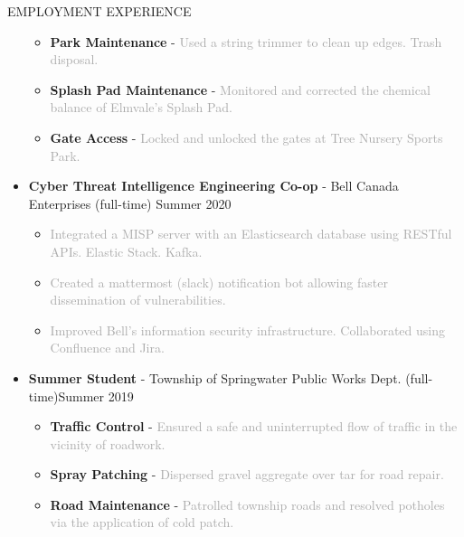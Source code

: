 \documentclass{resume} %
\begin{document}
\begin{rSection}{EMPLOYMENT EXPERIENCE}
\begin{itemize}
\begin{itemize}[topsep=-10pt]
            \item[\textbullet] {\bf Park Maintenance} - \textcolor{darkgray}{Used a string trimmer to clean up edges. Trash disposal.}
            \item[\textbullet] {\bf Splash Pad Maintenance} - \textcolor{darkgray}{Monitored and corrected the chemical balance of Elmvale's Splash Pad.}
            \item[\textbullet] {\bf Gate Access} - \textcolor{darkgray}{Locked and unlocked the gates at Tree Nursery Sports Park.}
        \end{itemize}
        \item {\bf Cyber Threat Intelligence Engineering Co-op} - Bell Canada Enterprises (full-time) \hfill {Summer 2020}
        \begin{itemize}[topsep=-10pt]
            \setlength\itemsep{-0.5em}
            \item[\textbullet] \textcolor{darkgray}{Integrated a MISP server with an Elasticsearch database using RESTful APIs. Elastic Stack. Kafka.}
            \item[\textbullet] \textcolor{darkgray}{Created a mattermost (slack) notification bot allowing faster dissemination of vulnerabilities.}
            \item[\textbullet] \textcolor{darkgray}{Improved Bell's information security infrastructure. Collaborated using Confluence and Jira.}
        \end{itemize}
        \item {\bf Summer Student} - Township of Springwater Public Works Dept. (full-time)\hfill {Summer 2019}
        \begin{itemize}[topsep=-10pt]
            \setlength\itemsep{-0.5em}
            \item[\textbullet] {\bf Traffic Control} - \textcolor{darkgray}{Ensured a safe and uninterrupted flow of traffic in the vicinity of roadwork.}
            \item[\textbullet] {\bf Spray Patching} - \textcolor{darkgray}{Dispersed gravel aggregate over tar for road repair.}
            \item[\textbullet] {\bf Road Maintenance} - \textcolor{darkgray}{Patrolled township roads and resolved potholes via the application of cold patch.}
        \end{itemize}
    \end{itemize}
\end{rSection}
\end{document}
